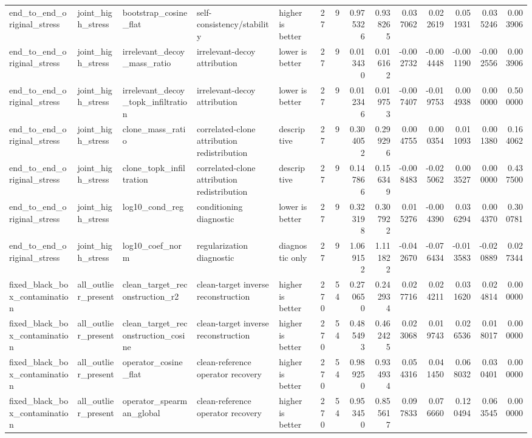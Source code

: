 \begin{table}[t]
\begin{tabular}{lllllrrrrrrrrr}
end_to_end_original_stress & joint_high_stress & bootstrap_cosine_flat & self-consistency/stability & higher is better & 27 & 9 & 0.975326 & 0.938265 & 0.037062 & 0.022619 & 0.051931 & 0.035246 & 0.003906 \\
end_to_end_original_stress & joint_high_stress & irrelevant_decoy_mass_ratio & irrelevant-decoy attribution & lower is better & 27 & 9 & 0.013430 & 0.016162 & -0.002732 & -0.004448 & -0.001190 & -0.002556 & 0.003906 \\
end_to_end_original_stress & joint_high_stress & irrelevant_decoy_topk_infiltration & irrelevant-decoy attribution & lower is better & 27 & 9 & 0.012346 & 0.019753 & -0.007407 & -0.019753 & 0.004938 & 0.000000 & 0.500000 \\
end_to_end_original_stress & joint_high_stress & clone_mass_ratio & correlated-clone attribution redistribution & descriptive & 27 & 9 & 0.304052 & 0.299296 & 0.004755 & 0.000354 & 0.011093 & 0.001380 & 0.164062 \\
end_to_end_original_stress & joint_high_stress & clone_topk_infiltration & correlated-clone attribution redistribution & descriptive & 27 & 9 & 0.147866 & 0.156349 & -0.008483 & -0.025062 & 0.003527 & 0.000000 & 0.437500 \\
end_to_end_original_stress & joint_high_stress & log10_cond_reg & conditioning diagnostic & lower is better & 27 & 9 & 0.323198 & 0.307922 & 0.015276 & -0.004390 & 0.036294 & 0.004370 & 0.300781 \\
end_to_end_original_stress & joint_high_stress & log10_coef_norm & regularization diagnostic & diagnostic only & 27 & 9 & 1.069152 & 1.111822 & -0.042670 & -0.076434 & -0.013583 & -0.020889 & 0.027344 \\
fixed_black_box_contamination & all_outlier_present & clean_target_reconstruction_r2 & clean-target inverse reconstruction & higher is better & 270 & 54 & 0.270650 & 0.242934 & 0.027716 & 0.024211 & 0.031620 & 0.024814 & 0.000000 \\
fixed_black_box_contamination & all_outlier_present & clean_target_reconstruction_cosine & clean-target inverse reconstruction & higher is better & 270 & 54 & 0.485493 & 0.462425 & 0.023068 & 0.019743 & 0.026536 & 0.018017 & 0.000000 \\
fixed_black_box_contamination & all_outlier_present & operator_cosine_flat & clean-reference operator recovery & higher is better & 270 & 54 & 0.989250 & 0.934934 & 0.054316 & 0.041450 & 0.068032 & 0.030401 & 0.000000 \\
fixed_black_box_contamination & all_outlier_present & operator_spearman_global & clean-reference operator recovery & higher is better & 270 & 54 & 0.953450 & 0.855617 & 0.097833 & 0.076660 & 0.120494 & 0.063545 & 0.000000 \\

\end{tabular}
\end{table}

